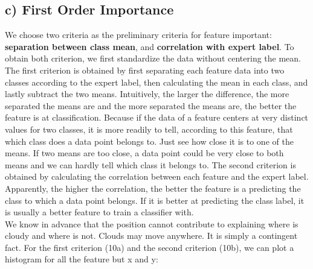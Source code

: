 \documentclass[jou]{apa}%
\begin{document}
\subsection{c) First Order Importance}
We choose two criteria as the preliminary criteria for feature important: \textbf{separation between class mean}, and \textbf{correlation with expert label}. To obtain both criterion, we first standardize the data without centering the mean. The first criterion is obtained by first separating each feature data into two classes according to the expert label, then calculating the mean in each class, and lastly subtract the two means. Intuitively, the larger the difference, the more separated the means are and the more separated the means are, the better the feature is at classification. Because if the data of a feature centers at very distinct values for two classes, it is more readily to tell, according to this feature, that which class does a data point belongs to. Just see how close it is to one of the means. If two means are too close, a data point could be very close to both means and we can hardly tell which class it belongs to. The second criterion is obtained by calculating the correlation between each feature and the expert label. Apparently, the higher the correlation, the better the feature is a predicting the class to which a data point belongs. If it is better at predicting the class label, it is usually a better feature to train a classifier with.\\
\indent We know in advance that the position cannot contribute to explaining where is cloudy and where is not. Clouds may move anywhere. It is simply a contingent fact. For the first criterion (10a) and the second criterion (10b), we can plot a histogram for all the feature but x and y:
\end{document}
